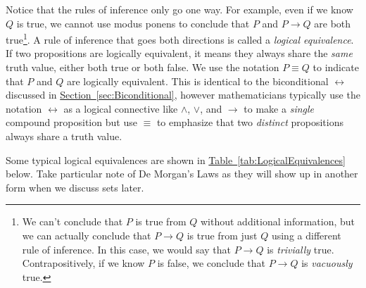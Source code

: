 \documentclass[11pt,oneside]{book}
\theoremstyle{definition}
\begin{document}
Notice that the rules of inference only go one way.
For example, even if we know $Q$ is true, we cannot use modus ponens to conclude that $P$ and $P \rightarrow Q$ are both true\footnote{
    We can't conclude that $P$ is true from $Q$ without additional information, but we can actually conclude that $P \rightarrow Q$ is true from just $Q$ using a different rule of inference.
    In this case, we would say that $P \rightarrow Q$ is \emph{trivially} true.
    Contrapositively, if we know $P$ is false, we conclude that $P \rightarrow Q$ is \emph{vacuously} true.
}.
A rule of inference that goes both directions is called a \emph{logical equivalence}.
If two propositions are logically equivalent, it means they always share the \emph{same} truth value, either both true or both false.
We use the notation $P \equiv Q$ to indicate that $P$ and $Q$ are logically equivalent.
This is identical to the biconditional $\leftrightarrow$ discussed in \hyperref[sec:Biconditional]{Section~\ref*{sec:Biconditional}}, however mathematicians typically use the notation $\leftrightarrow$ as a logical connective like $\land$, $\lor$, and $\rightarrow$ to make a \emph{single} compound proposition but use $\equiv$ to emphasize that two \emph{distinct} propositions always share a truth value.

Some typical logical equivalences are shown in \hyperref[tab:LogicalEquivalences]{Table~\ref*{tab:LogicalEquivalences}} below.
Take particular note of De Morgan's Laws as they will show up in another form when we discuss sets later.
\end{document}
